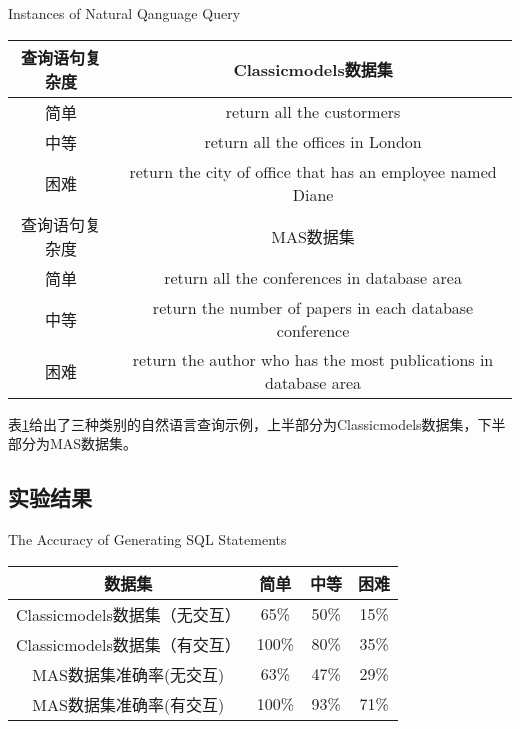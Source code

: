 \begin{table}[!hpb]
  \centering
    {Instances of Natural Qanguage Query}
  \label{nli:zryycxsl}
  \begin{tabular}{cc} \toprule
    查询语句复杂度 & Classicmodels数据集\\\midrule
    简单 & return all the custormers\\
    中等 & return all the offices in London\\
    困难 & return the city of office that has an employee named Diane\\
    \midrule
    查询语句复杂度 & MAS数据集\\\midrule
    简单 & return all the conferences in database area\\
    中等 & return the number of papers in each database conference\\
    困难 & return the author who has the most publications in database area\\
    \bottomrule
  \end{tabular}
\end{table}
表\ref{nli:zryycxsl}给出了三种类别的自然语言查询示例，上半部分为Classicmodels数据集，下半部分为MAS数据集。

\subsection{实验结果}

\begin{table}[!hpb]
  \centering
    {The Accuracy of Generating SQL Statements}
  \label{nli:mxscsyjdzqx}
  \begin{tabular}{cccc} \toprule
    数据集 & 简单 & 中等 & 困难\\
    \midrule
    Classicmodels数据集（无交互）& 65\% & 50\% & 15\% \\
    Classicmodels数据集（有交互）& 100\% & 80\% & 35\% \\
    MAS数据集准确率(无交互) & 63\% & 47\% & 29\% \\
    MAS数据集准确率(有交互) & 100\% & 93\% & 71\% \\
    \bottomrule
  \end{tabular}
\end{table}

